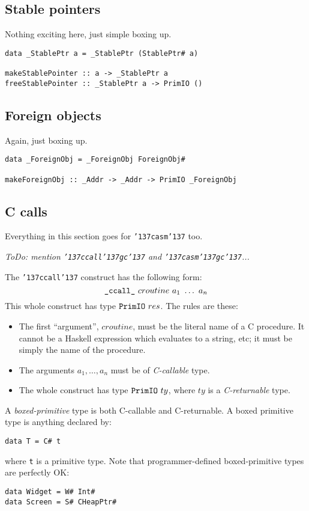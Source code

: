\subsection{Stable pointers}

Nothing exciting here, just simple boxing up.
\begin{verbatim}
data _StablePtr a = _StablePtr (StablePtr# a)

makeStablePointer :: a -> _StablePtr a
freeStablePointer :: _StablePtr a -> PrimIO ()
\end{verbatim}

\subsection{Foreign objects}

Again, just boxing up.
\begin{verbatim}
data _ForeignObj = _ForeignObj ForeignObj#

makeForeignObj :: _Addr -> _Addr -> PrimIO _ForeignObj
\end{verbatim}

\subsection{C calls}

Everything in this section goes for \mbox{\tt {\char'137}casm{\char'137}} too.

{\em ToDo: mention \mbox{\tt {\char'137}ccall{\char'137}gc{\char'137}} and \mbox{\tt {\char'137}casm{\char'137}gc{\char'137}}...}

The \mbox{\tt {\char'137}ccall{\char'137}} construct has the following form:
$$\mbox{\tt {\char'137}ccall{\char'137}}~croutine~a_1~\ldots~a_n$$
This whole construct has type $\mbox{\tt PrimIO}~res$.
The rules are these:
\begin{itemize}
\item
The first ``argument'', $croutine$, must be the literal name of a C procedure.
It cannot be a Haskell expression which evaluates to a string, etc; it must be 
simply the name of the procedure.
\item
The arguments $a_1, \ldots,a_n$ must be of {\em C-callable} type.
\item
The whole construct has type $\mbox{\tt PrimIO}~ty$, where $ty$ is a {\em C-returnable} type.
\end{itemize}
A {\em boxed-primitive} type is both C-callable and C-returnable.
A boxed primitive type is anything declared by:
\begin{verbatim}
data T = C# t
\end{verbatim}
where \mbox{\tt t} is a primitive type.  Note that
programmer-defined boxed-primitive types are perfectly OK:
\begin{verbatim}
data Widget = W# Int#
data Screen = S# CHeapPtr#
\end{verbatim}

